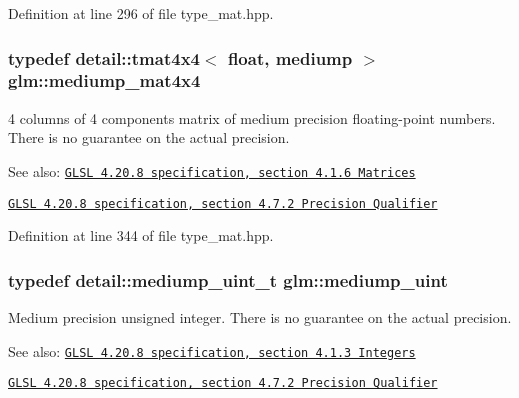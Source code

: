 Definition at line 296 of file type\_\-mat.hpp.\hypertarget{group__core__precision_gcb51d2d10f7607617ac544f6db9a6eef}{
\subsubsection[mediump\_\-mat4x4]{\setlength{\rightskip}{0pt plus 5cm}typedef detail::tmat4x4$<$ float, mediump $>$ {\bf glm::mediump\_\-mat4x4}}}
\label{group__core__precision_gcb51d2d10f7607617ac544f6db9a6eef}


4 columns of 4 components matrix of medium precision floating-point numbers. There is no guarantee on the actual precision.

\begin{Desc}
\item[See also:]\href{http://www.opengl.org/registry/doc/GLSLangSpec.4.20.8.pdf}{\tt GLSL 4.20.8 specification, section 4.1.6 Matrices} 

\href{http://www.opengl.org/registry/doc/GLSLangSpec.4.20.8.pdf}{\tt GLSL 4.20.8 specification, section 4.7.2 Precision Qualifier} \end{Desc}


Definition at line 344 of file type\_\-mat.hpp.\hypertarget{group__core__precision_g08ae38ad78ade3539fdd1d25052b8c51}{
\subsubsection[mediump\_\-uint]{\setlength{\rightskip}{0pt plus 5cm}typedef detail::mediump\_\-uint\_\-t {\bf glm::mediump\_\-uint}}}
\label{group__core__precision_g08ae38ad78ade3539fdd1d25052b8c51}


Medium precision unsigned integer. There is no guarantee on the actual precision.

\begin{Desc}
\item[See also:]\href{http://www.opengl.org/registry/doc/GLSLangSpec.4.20.8.pdf}{\tt GLSL 4.20.8 specification, section 4.1.3 Integers} 

\href{http://www.opengl.org/registry/doc/GLSLangSpec.4.20.8.pdf}{\tt GLSL 4.20.8 specification, section 4.7.2 Precision Qualifier} \end{Desc}


